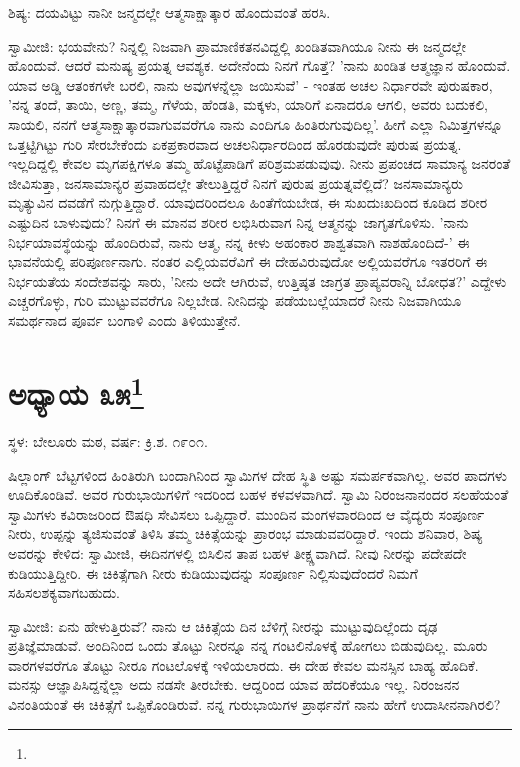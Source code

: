 ಶಿಷ್ಯ: ದಯವಿಟ್ಟು ನಾನೀ ಜನ್ಮದಲ್ಲೇ ಆತ್ಮಸಾಕ್ಷಾತ್ಕಾರ ಹೊಂದುವಂತೆ ಹರಸಿ.

ಸ್ವಾಮೀಜಿ: ಭಯವೇನು? ನಿನ್ನಲ್ಲಿ ನಿಜವಾಗಿ ಪ್ರಾಮಾಣಿಕತನವಿದ್ದಲ್ಲಿ ಖಂಡಿತವಾಗಿಯೂ ನೀನು ಈ ಜನ್ಮದಲ್ಲೇ ಹೊಂದುವೆ. ಆದರೆ ಮನುಷ್ಯ ಪ್ರಯತ್ನ ಆವಶ್ಯಕ. ಅದೇನೆಂದು ನಿನಗೆ ಗೊತ್ತೆ? 'ನಾನು ಖಂಡಿತ ಆತ್ಮಜ್ಞಾನ ಹೊಂದುವೆ. ಯಾವ ಅಡ್ಡಿ ಆತಂಕಗಳೇ ಬರಲಿ, ನಾನು ಅವುಗಳನ್ನೆಲ್ಲಾ ಜಯಿಸುವೆ' - ಇಂತಹ ಅಚಲ ನಿರ್ಧಾರವೇ ಪುರುಷಕಾರ, 'ನನ್ನ ತಂದೆ, ತಾಯಿ, ಅಣ್ಣ, ತಮ್ಮ, ಗೆಳೆಯ, ಹೆಂಡತಿ, ಮಕ್ಕಳು, ಯಾರಿಗೆ ಏನಾದರೂ ಆಗಲಿ, ಅವರು ಬದುಕಲಿ, ಸಾಯಲಿ, ನನಗೆ ಆತ್ಮಸಾಕ್ಷಾತ್ಕಾರವಾಗುವವರೆಗೂ ನಾನು ಎಂದಿಗೂ ಹಿಂತಿರುಗುವುದಿಲ್ಲ'. ಹೀಗೆ ಎಲ್ಲಾ ನಿಮಿತ್ತಗಳನ್ನೂ ಒತ್ತಟ್ಟಿಗಿಟ್ಟು ಗುರಿ ಸೇರಬೇಕೆಂದು ಏಕಪ್ರಕಾರವಾದ ಅಚಲನಿರ್ಧಾರದಿಂದ ಹೊರಡುವುದೇ ಪುರುಷ ಪ್ರಯತ್ನ. ಇಲ್ಲದಿದ್ದಲ್ಲಿ ಕೇವಲ ಮೃಗಪಕ್ಷಿಗಳೂ ತಮ್ಮ ಹೊಟ್ಟೆಪಾಡಿಗೆ ಪರಿಶ್ರಮಪಡುವುವು. ನೀನು ಪ್ರಪಂಚದ ಸಾಮಾನ್ಯ ಜನರಂತೆ ಜೀವಿಸುತ್ತಾ, ಜನಸಾಮಾನ್ಯರ ಪ್ರವಾಹದಲ್ಲೇ ತೇಲುತ್ತಿದ್ದರೆ ನಿನಗೆ ಪುರುಷ ಪ್ರಯತ್ನವೆಲ್ಲಿದೆ? ಜನಸಾಮಾನ್ಯರು ಮೃತ್ಯುವಿನ ದವಡೆಗೆ ನುಗ್ಗುತ್ತಿದ್ದಾರೆ. ಯಾವುದರಿಂದಲೂ ಹಿಂತೆಗೆಯಬೇಡ, ಈ ಸುಖದುಃಖದಿಂದ ಕೂಡಿದ ಶರೀರ ಎಷ್ಟುದಿನ ಬಾಳುವುದು? ನಿನಗೆ ಈ ಮಾನವ ಶರೀರ ಲಭಿಸಿರುವಾಗ ನಿನ್ನ ಆತ್ಮನನ್ನು ಜಾಗೃತಗೊಳಿಸು. 'ನಾನು ನಿರ್ಭಯಾವಸ್ಥೆಯನ್ನು ಹೊಂದಿರುವೆ, ನಾನು ಆತ್ಮ, ನನ್ನ ಕೀಳು ಅಹಂಕಾರ ಶಾಶ್ವತವಾಗಿ ನಾಶಹೊಂದಿದೆ-' ಈ ಭಾವನೆಯಲ್ಲಿ ಪರಿಪೂರ್ಣನಾಗು. ನಂತರ ಎಲ್ಲಿಯವರೆವಿಗೆ ಈ ದೇಹವಿರುವುದೋ ಅಲ್ಲಿಯವರೆಗೂ ಇತರರಿಗೆ ಈ ನಿರ್ಭಯತೆಯ ಸಂದೇಶವನ್ನು ಸಾರು, 'ನೀನು ಅದೇ ಆಗಿರುವೆ, ಉತ್ತಿಷ್ಠತ ಜಾಗ್ರತ ಪ್ರಾಪ್ಯವರಾನ್ನಿ ಬೋಧತ?' ಎದ್ದೇಳು ಎಚ್ಚರಗೊಳ್ಳು, ಗುರಿ ಮುಟ್ಟುವವರೆಗೂ ನಿಲ್ಲಬೇಡ. ನೀನಿದನ್ನು ಪಡೆಯಬಲ್ಲೆಯಾದರೆ ನೀನು ನಿಜವಾಗಿಯೂ ಸಮರ್ಥನಾದ ಪೂರ್ವ ಬಂಗಾಳಿ ಎಂದು ತಿಳಿಯುತ್ತೇನೆ.

\newpage

\chapter[ಅಧ್ಯಾಯ ೩೫]{ಅಧ್ಯಾಯ ೩೫\protect\footnote{}}

\begin{center}
ಸ್ಥಳ: ಬೇಲೂರು ಮಠ, ವರ್ಷ: ಕ್ರಿ.ಶ. ೧೯೦೧.
\end{center}

ಷಿಲ್ಲಾಂಗ್ ಬೆಟ್ಟಗಳಿಂದ ಹಿಂತಿರುಗಿ ಬಂದಾಗಿನಿಂದ ಸ್ವಾಮಿಗಳ ದೇಹ ಸ್ಥಿತಿ ಅಷ್ಟು ಸಮರ್ಪಕವಾಗಿಲ್ಲ. ಅವರ ಪಾದಗಳು ಊದಿಕೊಂಡಿವೆ. ಅವರ ಗುರುಭಾಯಿಗಳಿಗೆ ಇದರಿಂದ ಬಹಳ ಕಳವಳವಾಗಿದೆ. ಸ್ವಾಮಿ ನಿರಂಜನಾನಂದರ ಸಲಹೆಯಂತೆ ಸ್ವಾಮಿಗಳು ಕವಿರಾಜರಿಂದ ಔಷಧಿ ಸೇವಿಸಲು ಒಪ್ಪಿದ್ದಾರೆ. ಮುಂದಿನ ಮಂಗಳವಾರದಿಂದ ಆ ವೈದ್ಯರು ಸಂಪೂರ್ಣ ನೀರು, ಉಪ್ಪನ್ನು ತ್ಯಜಿಸುವಂತೆ ತಿಳಿಸಿ ತಮ್ಮ ಚಿಕಿತ್ಸೆಯನ್ನು ಪ್ರಾರಂಭ ಮಾಡುವವರಿದ್ದಾರೆ. ಇಂದು ಶನಿವಾರ, ಶಿಷ್ಯ ಅವರನ್ನು ಕೇಳಿದ: ಸ್ವಾಮೀಜಿ, ಈದಿನಗಳಲ್ಲಿ ಬಿಸಿಲಿನ ತಾಪ ಬಹಳ ತೀಕ್ಷ್ಣವಾಗಿದೆ. ನೀವು ನೀರನ್ನು ಪದೇಪದೇ ಕುಡಿಯುತ್ತಿದ್ದೀರಿ. ಈ ಚಿಕಿತ್ಸೆಗಾಗಿ ನೀರು ಕುಡಿಯುವುದನ್ನು ಸಂಪೂರ್ಣ ನಿಲ್ಲಿಸುವುದೆಂದರೆ ನಿಮಗೆ ಸಹಿಸಲಶಕ್ಯವಾಗಬಹುದು.

ಸ್ವಾಮೀಜಿ: ಏನು ಹೇಳುತ್ತಿರುವೆ? ನಾನು ಆ ಚಿಕಿತ್ಸೆಯ ದಿನ ಬೆಳಿಗ್ಗೆ ನೀರನ್ನು ಮುಟ್ಟುವುದಿಲ್ಲೆಂದು ದೃಢ ಪ್ರತಿಜ್ಞೆಮಾಡುವೆ. ಅಂದಿನಿಂದ ಒಂದು ತೊಟ್ಟು ನೀರನ್ನೂ ನನ್ನ ಗಂಟಲಿನೊಳಕ್ಕೆ ಹೋಗಲು ಬಿಡುವುದಿಲ್ಲ. ಮೂರು ವಾರಗಳವರೆಗೂ ತೊಟ್ಟು ನೀರೂ ಗಂಟಲೊಳಕ್ಕೆ ಇಳಿಯಲಾರದು. ಈ ದೇಹ ಕೇವಲ ಮನಸ್ಸಿನ ಬಾಹ್ಯ ಹೊದಿಕೆ. ಮನಸ್ಸು ಆಜ್ಞಾಪಿಸಿದ್ದನ್ನೆಲ್ಲಾ ಅದು ನಡಸೇ ತೀರಬೇಕು. ಆದ್ದರಿಂದ ಯಾವ ಹೆದರಿಕೆಯೂ ಇಲ್ಲ. ನಿರಂಜನನ ವಿನಂತಿಯಂತೆ ಈ ಚಿಕಿತ್ಸೆಗೆ ಒಪ್ಪಿಕೊಂಡಿರುವೆ. ನನ್ನ ಗುರುಭಾಯಿಗಳ ಪ್ರಾರ್ಥನೆಗೆ ನಾನು ಹೇಗೆ ಉದಾಸೀನನಾಗಿರಲಿ?

